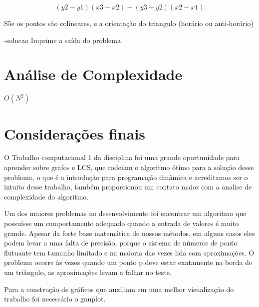 \documentclass[12pt,a4paper]{article}
\begin{document}
\[(y2-y1) (x3-x2) - (y3-y2) (x2-x1)\]

S5e os pontos são colineares, e a orientação do triangulo (horário ou anti-horário)

-solucao
Imprime a saída do problema

\section{Análise de Complexidade}

$O(N^2)$

\section{Considerações finais}

O Trabalho computacional 1 da disciplina foi uma grande oportunidade para aprender sobre grafos e LCS, que rodeiam o algoritmo ótimo para a solução desse problema, o que é a introdução para programação dinâmica e acreditamos ser o intuito desse trabalho, também proporcionou um contato maior com a analise de complexidade do algoritmo. 

Um dos maiores problemas no desenvolvimento foi encontrar um algoritmo que possuísse um comportamento adequado quando a entrada de valores é muito grande. Apesar da forte base matemática de nossos métodos, em alguns casos eles podem levar a uma falta de precisão, porque o sistema de números de ponto flutuante tem tamanho limitado e na maioria das vezes lida com aproximações. O problema ocorre às vezes quando um ponto p deve estar exatamente na borda de um triângulo, as aproximações levam a falhar no teste. 

Para a construção de gráficos que auxiliam em uma melhor visualização do trabalho foi necessário o gnuplot.


\begin{flushleft}
	\nocite{*}
	
\end{flushleft}
\end{document}
